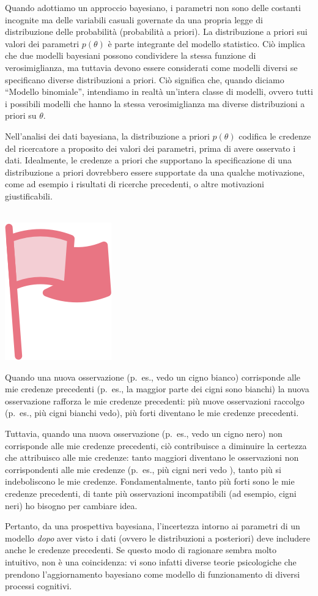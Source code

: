 \documentclass[
  10pt,
  italian,
  a4paper,
  extrafontsizes,onecolumn,openright
  ]{memoir}
\newenvironment{mdframedwithfootImportant}
{   
    \savenotes
    \begin{mdframed}[%
    topline=true, bottomline=true, linecolor=oiR, linewidth=0.5pt,
    rightline=false, leftline=false,
    backgroundcolor=oiLGray]
    \renewcommand{\thempfootnote}{\arabic{footnote}}
    }
{
    \end{mdframed}
    \spewnotes
}
\newenvironment{important}{
    \let\oldtextbf\textbf
    \renewcommand{\textbf}[1]{{\textcolor{oiR}{\oldtextbf{##1}}}}
\vspace{4mm}
\begin{mdframedwithfootImportant}
\begin{minipage}[t]{0.10\textwidth}
{$\:$ \\ \setkeys{Gin}{width=2.5em,keepaspectratio}\includegraphics{images/_icons/important.png}}
\end{minipage}
\hfill
\begin{minipage}[t]{0.90\textwidth}
\vspace{-2mm}
\setlength{\parskip}{1em}
}{\end{minipage}
\end{mdframedwithfootImportant}
\vspace{4mm}
}
\begin{document}
Quando adottiamo un approccio bayesiano, i parametri non sono delle costanti incognite ma delle variabili casuali governate da una propria legge di distribuzione delle probabilità (probabilità a priori). La distribuzione a priori sui valori dei parametri \(p(\theta)\) è parte integrante del modello statistico. Ciò implica che due modelli bayesiani possono condividere la stessa funzione di verosimiglianza, ma tuttavia devono essere considerati come modelli diversi se specificano diverse distribuzioni a priori. Ciò significa che, quando diciamo ``Modello binomiale'', intendiamo in realtà un'intera classe di modelli, ovvero tutti i possibili modelli che hanno la stessa verosimiglianza ma diverse distribuzioni a priori su \(\theta\).

Nell'analisi dei dati bayesiana, la distribuzione a priori \(p(\theta)\) codifica le credenze del ricercatore a proposito dei valori dei parametri, prima di avere osservato i dati. Idealmente, le credenze a priori che supportano la specificazione di una distribuzione a priori dovrebbero essere supportate da una qualche motivazione, come ad esempio i risultati di ricerche precedenti, o altre motivazioni giustificabili.

\begin{important}
Quando una nuova osservazione (p.~es., vedo un cigno bianco) corrisponde alle mie credenze precedenti (p.~es., la maggior parte dei cigni sono bianchi) la nuova osservazione rafforza le mie credenze precedenti: più nuove osservazioni raccolgo (p.~es., più cigni bianchi vedo), più forti diventano le mie credenze precedenti.

Tuttavia, quando una nuova osservazione (p.~es., vedo un cigno nero) non corrisponde alle mie credenze precedenti, ciò contribuisce a diminuire la certezza che attribuisco alle mie credenze: tanto maggiori diventano le osservazioni non corrispondenti alle mie credenze (p.~es., più cigni neri vedo ), tanto più si indeboliscono le mie credenze. Fondamentalmente, tanto più forti sono le mie credenze precedenti, di tante più osservazioni incompatibili (ad esempio, cigni neri) ho bisogno per cambiare idea.

Pertanto, da una prospettiva bayesiana, l'incertezza intorno ai parametri di un modello \emph{dopo} aver visto i dati (ovvero le distribuzioni a posteriori) deve includere anche le credenze precedenti. Se questo modo di ragionare sembra molto intuitivo, non è una coincidenza: vi sono infatti diverse teorie psicologiche che prendono l'aggiornamento bayesiano come modello di funzionamento di diversi processi cognitivi.

\end{important}
\end{document}
